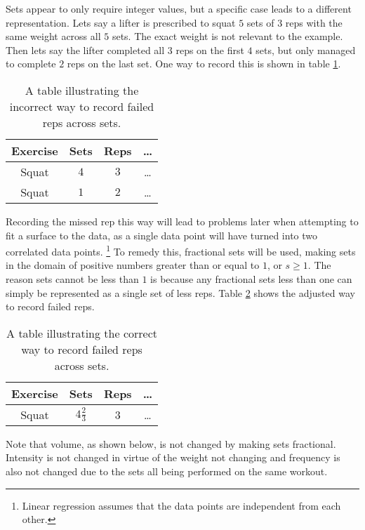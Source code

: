 Sets appear to only require integer values, but a specific case leads to a different representation. Lets say a lifter is prescribed to squat $5$ sets of $3$ reps with the same weight across all $5$ sets. The exact weight is not relevant to the example. Then lets say the lifter completed all $3$ reps on the first $4$ sets, but only managed to complete $2$ reps on the last set. One way to record this is shown in table \ref{tab:P1_FailedSetExampleIncorrectData}.

\begin{table}[h]
    \centering
    \begin{tabular}{c|c|c|c}
        Exercise & Sets & Reps & \dots \\
        \hline
        Squat & $4$ & $3$ & \dots \\
        Squat & $1$ & $2$ & \dots \\ 
    \end{tabular}
    \caption{A table illustrating the incorrect way to record failed reps across sets.}
    \label{tab:P1_FailedSetExampleIncorrectData}
\end{table}

Recording the missed rep this way will lead to problems later when attempting to fit a surface to the data, as a single data point will have turned into two correlated data points. \footnote{Linear regression assumes that the data points are independent from each other.} To remedy this, fractional sets will be used, making sets in the domain of positive numbers greater than or equal to $1$, or $s\ge 1$. The reason sets cannot be less than $1$ is because any fractional sets less than one can simply be represented as a single set of less reps. Table \ref{tab:P1_FailedSetExampleCorrectData} shows the adjusted way to record failed reps.

\begin{table}[h]
    \centering
    \begin{tabular}{c|c|c|c}
        Exercise & Sets & Reps & \dots \\
        \hline
        Squat & $4\frac{2}{3}$ & 3 & \dots \\
    \end{tabular}
    \caption{A table illustrating the correct way to record failed reps across sets.}
    \label{tab:P1_FailedSetExampleCorrectData}
\end{table}

Note that volume, as shown below, is not changed by making sets fractional. Intensity is not changed in virtue of the weight not changing and frequency is also not changed due to the sets all being performed on the same workout.

